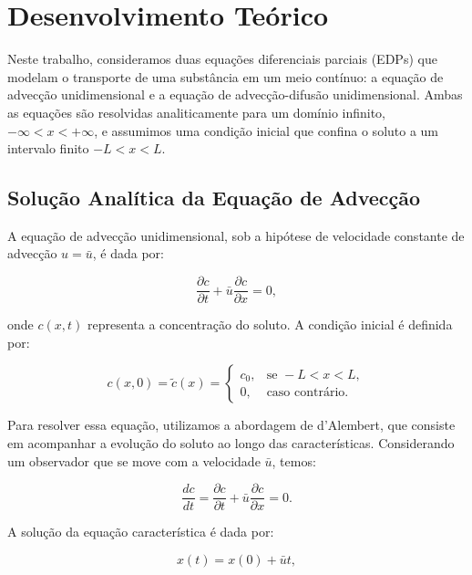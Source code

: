 \section{Desenvolvimento Teórico}

Neste trabalho, consideramos duas equações diferenciais parciais (EDPs) que modelam o transporte de uma substância em um meio contínuo: a equação de advecção unidimensional e a equação de advecção-difusão unidimensional. Ambas as equações são resolvidas analiticamente para um domínio infinito, \(-\infty < x < +\infty\), e assumimos uma condição inicial que confina o soluto a um intervalo finito \( -L < x < L \).

\subsection{Solução Analítica da Equação de Advecção}

A equação de advecção unidimensional, sob a hipótese de velocidade constante de advecção \( u = \bar{u} \), é dada por:

\begin{equation}
    \frac{\partial c}{\partial t} + \bar{u} \frac{\partial c}{\partial x} = 0,
\end{equation}

onde \( c(x,t) \) representa a concentração do soluto. A condição inicial é definida por:

\begin{equation}
    c(x, 0) = \tilde{c}(x) = \begin{cases}
    c_0, & \text{se } -L < x < L, \\
    0, & \text{caso contrário}.
    \end{cases}
\end{equation}

Para resolver essa equação, utilizamos a abordagem de d'Alembert, que consiste em acompanhar a evolução do soluto ao longo das características. Considerando um observador que se move com a velocidade \( \bar{u} \), temos:

\begin{equation}
    \frac{d c}{d t} = \frac{\partial c}{\partial t} + \bar{u} \frac{\partial c}{\partial x} = 0.
\end{equation}

A solução da equação característica é dada por:

\begin{equation}
    x(t) = x(0) + \bar{u} t,
\end{equation}


